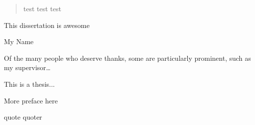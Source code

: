 
\begin{abstract}%
  test test test
\end{abstract}


\begin{declaration}
  This dissertation is awesome
  \vspace*{1cm}
  \begin{flushright}
    My Name
  \end{flushright}
\end{declaration}


\begin{acknowledgements}
  Of the many people who deserve thanks, some are particularly prominent,
  such as my supervisor\dots
\end{acknowledgements}


\begin{preface}
  This is a thesis...

  \noindent
  More preface here
\end{preface}

\tableofcontents

\frontquote%
  {quote}%
  {quoter}


